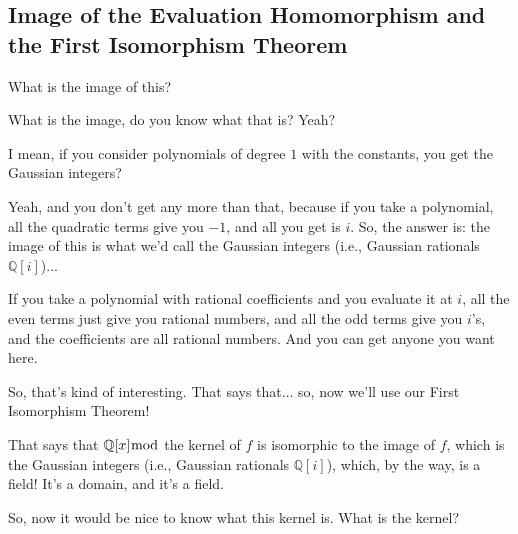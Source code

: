 \subsection{Image of the Evaluation Homomorphism and the First Isomorphism Theorem}

\begin{speech}[01:22:36 - 01:23:27]
What is the image of this?  

What is the image, do you know what that is? Yeah?
\end{speech}

\begin{student}
I mean, if you consider polynomials of degree $1$ with the constants, you get the Gaussian integers?
\end{student}

\begin{speech}[01:23:27 - 01:24:50]
Yeah, and you don't get any more than that, because if you take a polynomial, all the quadratic terms give you $-1$, and all you get is $i$. So, the answer is: the image of this is what we'd call the Gaussian integers (i.e., Gaussian rationals $\mathbb{Q}[i]$)...  

If you take a polynomial with rational coefficients and you evaluate it at $i$, all the even terms just give you rational numbers, and all the odd terms give you $i$'s, and the coefficients are all rational numbers. And you can get anyone you want here. 

So, that's kind of interesting. That says that... so, now we'll use our First Isomorphism Theorem!  

That says that $\mathbb{Q}[x] \bmod$ the kernel of $f$ is isomorphic to the image of $f$, which is the Gaussian integers (i.e., Gaussian rationals $\mathbb{Q}[i]$), which, by the way, is a field!  It's a domain, and it's a field. 

So, now it would be nice to know what this kernel is. What is the kernel? 
\end{speech}

